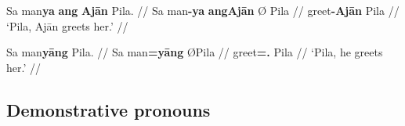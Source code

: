 \pex
\a\begingl
	\gla Sa man\textbf{ya} \textbf{ang} \textbf{Ajān} {} Pila. //
	\glb Sa man\textbf{-ya} \textbf{ang} \textbf{​Ajān} Ø ​Pila //
	\glc \PatT{} greet\textbf{-\TsgM{}} \textbf{\Aarg{}} \textbf{​Ajān} 
		\Top{} ​Pila //
	\glft `Pila, Ajān greets her.' //
\endgl

\a\begingl
	\gla Sa man\textbf{yāng} {} Pila. //
	\glb Sa man\textbf{=yāng} Ø ​Pila //
	\glc \PatT{} greet\textbf{=\TsgM{}.\Aarg{}} \Top{} ​Pila //
	\glft `Pila, he greets her.' //
\endgl
\xe


% 
% 
% 

\subsection{Demonstrative pronouns}
\label{subsec:dempro}

